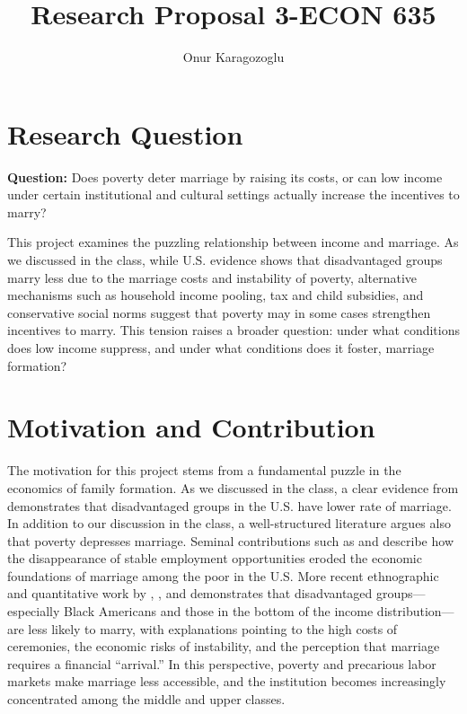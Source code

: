 

\title{Research Proposal 3-ECON 635}
\author{Onur Karagozoglu}
\date{}
\doublespacing



\maketitle

\section*{Research Question}

\textbf{Question:} Does poverty deter marriage by raising its costs, or can low income under certain institutional and cultural settings actually increase the incentives to marry?

This project examines the puzzling relationship between income and marriage. As we discussed in the class, while U.S. evidence shows that disadvantaged groups marry less due to the marriage costs and instability of poverty, alternative mechanisms such as household income pooling, tax and child subsidies, and conservative social norms suggest that poverty may in some cases strengthen incentives to marry. This tension raises a broader question: under what conditions does low income suppress, and under what conditions does it foster, marriage formation?

\section*{Motivation and Contribution}

The motivation for this project stems from a fundamental puzzle in the economics of family formation. As we discussed in the class, a clear evidence from \citet{GarciaHeckman2023} demonstrates that disadvantaged groups in the U.S. have lower rate of marriage. In addition to our discussion in the class, a well-structured literature argues also that poverty depresses marriage. Seminal contributions such as \citet{Wilson1987} and \citet{Murray1994} describe how the disappearance of stable employment opportunities eroded the economic foundations of marriage among the poor in the U.S. More recent ethnographic and quantitative work by \citet{EdinKefalas2005}, \citet{Cherlin2004}, and \citet{Autor2019} demonstrates that disadvantaged groups—especially Black Americans and those in the bottom of the income distribution—are less likely to marry, with explanations pointing to the high costs of ceremonies, the economic risks of instability, and the perception that marriage requires a financial “arrival.” In this perspective, poverty and precarious labor markets make marriage less accessible, and the institution becomes increasingly concentrated among the middle and upper classes.


